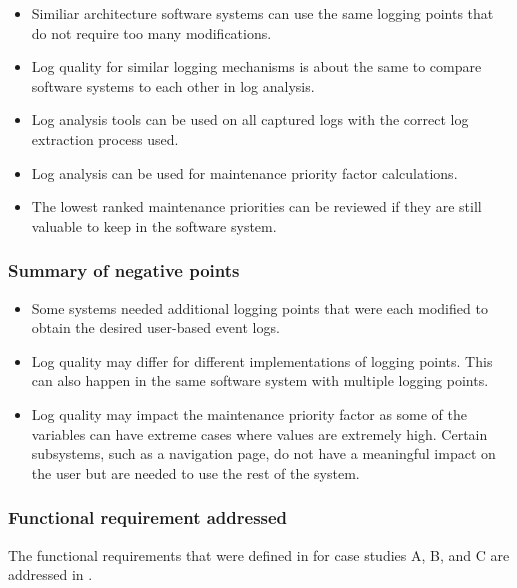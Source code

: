 \begin{itemize}
	\item Similiar architecture software systems can use the same logging points that do not require too many modifications.
	\item Log quality for similar logging mechanisms is about the same to compare software systems to each other in log analysis.
	\item Log analysis tools can be used on all captured logs with the correct log extraction process used.
	\item Log analysis can be used for maintenance priority factor calculations.
	\item The lowest ranked maintenance priorities can be reviewed if they are still valuable to keep in the software system.
\end{itemize}

\subsubsection{Summary of negative points}

\begin{itemize}
	\item Some systems needed additional logging points that were each modified to obtain the desired user-based event logs.
	\item Log quality may differ for different implementations of logging points. This can also happen in the same software system with multiple logging points.
	\item Log quality may impact the maintenance priority factor as some of the variables can have extreme cases where values are extremely high. Certain subsystems, such as a navigation page, do not have a meaningful impact on the user but are needed to use the rest of the system.
\end{itemize}

\clearpage

\subsubsection{Functional requirement addressed}
The functional requirements that were defined in  for case studies A, B, and C are addressed in .

